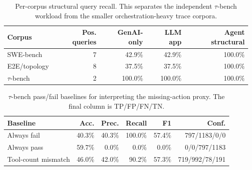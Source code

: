 \documentclass[conference]{IEEEtran}
\begin{document}
\begin{table}[t]
\centering
\scriptsize
\caption{Per-corpus structural query recall. This separates the
independent $\tau$-bench workload from the smaller orchestration-heavy
trace corpora.}
\label{tab:percorpus}
\begin{tabular}{@{}lrrrr@{}}
\toprule
Corpus & Pos. queries & GenAI-only & LLM app & Agent structural \\
\midrule
SWE-bench & 7 & 42.9\% & 42.9\% & 100.0\% \\
E2E/topology & 8 & 37.5\% & 37.5\% & 100.0\% \\
$\tau$-bench & 2 & 100.0\% & 100.0\% & 100.0\% \\
\bottomrule
\end{tabular}
\end{table}

\begin{table}[t]
\centering
\scriptsize
\caption{$\tau$-bench outcome validation. Missing expected actions are
used as a schema-observable failure proxy and evaluated against external
task pass/fail labels. The final column is TP/FP/FN/TN for failure
prediction.}
\label{tab:tauoutcome}
\end{table}

\begin{table}[t]
\centering
\scriptsize
\caption{$\tau$-bench pass/fail baselines for interpreting the
missing-action proxy. The final column is TP/FP/FN/TN.}
\label{tab:taubaselines}
\begin{tabular}{@{}lrrrrr@{}}
\toprule
Baseline & Acc. & Prec. & Recall & F1 & Conf. \\
\midrule
Always fail & 40.3\% & 40.3\% & 100.0\% & 57.4\% & 797/1183/0/0 \\
Always pass & 59.7\% & 0.0\% & 0.0\% & 0.0\% & 0/0/797/1183 \\
Tool-count mismatch & 46.0\% & 42.0\% & 90.2\% & 57.3\% & 719/992/78/191 \\
\bottomrule
\end{tabular}
\end{table}
\end{document}
